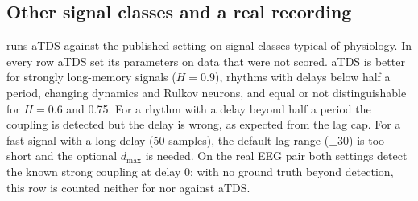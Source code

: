 \documentclass[11pt,a4paper]{article}
\begin{document}
\subsection{Other signal classes and a real recording}
 runs aTDS against the published setting on signal classes typical of physiology. In every row aTDS set its parameters on data that were not scored. aTDS is better for strongly long-memory signals ($H = 0.9$), rhythms with delays below half a period, changing dynamics and Rulkov neurons, and equal or not distinguishable for $H = 0.6$ and 0.75. For a rhythm with a delay beyond half a period the coupling is detected but the delay is wrong, as expected from the lag cap. For a fast signal with a long delay (50 samples), the default lag range ($\pm30$) is too short and the optional $d_{\max}$ is needed. On the real EEG pair both settings detect the known strong coupling at delay 0; with no ground truth beyond detection, this row is counted neither for nor against aTDS.
\end{document}

